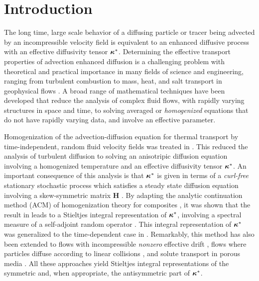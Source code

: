 \documentclass[11pt]{amsart}
\newcommand{\Hb}{\mathbf{H}}
\newcommand\bkappa{\mbox{\boldmath${\kappa}$}}
\begin{document}
\section{Introduction}\label{sec:Introduction}
%
The long time, large scale behavior of a diffusing particle   
or tracer being advected by an incompressible velocity field 
is equivalent to an enhanced diffusive process \cite{Taylor:PRSL:196} 
with an effective diffusivity tensor $\bkappa^*$.
Determining the effective transport properties of advection enhanced
diffusion is a challenging problem with theoretical and practical 
importance in many fields of science and engineering,
ranging from turbulent combustion to mass, heat, and salt transport in
geophysical flows \cite{Moffatt:RPP:621}. A broad range of
mathematical techniques have been developed that reduce the analysis
of complex fluid flows, with rapidly varying structures in space and
time, to solving averaged or \textit{homogenized} equations that do
not have rapidly varying data, and involve an effective parameter.




Homogenization of the advection-diffusion equation for thermal
transport by time-independent, random fluid velocity fields was
treated in \cite{McLaughlin:SIAM_JAM:780}. This 
reduced the analysis of turbulent diffusion to solving an anisotripic
diffusion equation involving a homogenized temperature and an
effective diffusivity tensor $\bkappa^*$. An important consequence of
this analysis is that $\bkappa^*$ is given in terms  
of a \emph{curl-free} stationary stochastic process which satisfies a
steady state diffusion equation involving a skew-symmetric
matrix $\Hb$ \cite{Avellaneda:CMP-339,Avellaneda:PRL-753}. By adapting
the analytic continuation method (ACM) of homogenization theory for
composites \cite{Golden:CMP-473}, it was shown that the result in
\cite{McLaughlin:SIAM_JAM:780} leads to a Stieltjes integral
representation of $\bkappa^*$, involving a spectral measure of a
self-adjoint random operator
\cite{Avellaneda:CMP-339,Avellaneda:PRL-753}. This integral
representation of $\bkappa^*$ was generalized to the time-dependent
case in \cite{Avellaneda:PRE:3249,Biferale:PF:2725}. Remarkably, this 
method has also been extended to flows with incompressible
\emph{nonzero} effective drift 
\cite{Pavliotis:PHD_Thesis}, flows where particles diffuse according
to linear collisions \cite{Pavliotis:IMAJAM:951}, and solute transport
in porous media \cite{Bhattacharya:AAP:1999:951}. All these approaches
yield Stieltjes integral representations of the symmetric and, when
appropriate, the antisymmetric part of $\bkappa^*$.
\end{document}
